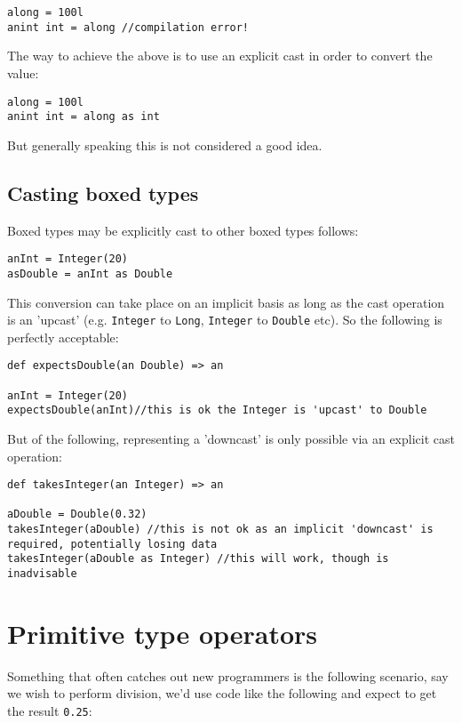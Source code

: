 \documentclass[conc-doc]{subfiles}
\begin{document}
\begin{lstlisting}
along = 100l
anint int = along //compilation error!
\end{lstlisting}

The way to achieve the above is to use an explicit cast in order to convert the value:

\begin{lstlisting}
along = 100l
anint int = along as int
\end{lstlisting}

But generally speaking this is not considered a good idea.

\subsection{Casting boxed types}
Boxed types may be explicitly cast to other boxed types follows:
\begin{lstlisting}
anInt = Integer(20)
asDouble = anInt as Double
\end{lstlisting}

This conversion can take place on an implicit basis as long as the cast operation is an 'upcast' (e.g. \lstinline{Integer} to \lstinline{Long}, \lstinline{Integer} to \lstinline{Double} etc). So the following is perfectly acceptable:
\begin{lstlisting}
def expectsDouble(an Double) => an

anInt = Integer(20)
expectsDouble(anInt)//this is ok the Integer is 'upcast' to Double
\end{lstlisting}

But of the following, representing a 'downcast' is only possible via an explicit cast operation:

\begin{lstlisting}
def takesInteger(an Integer) => an

aDouble = Double(0.32)
takesInteger(aDouble) //this is not ok as an implicit 'downcast' is required, potentially losing data
takesInteger(aDouble as Integer) //this will work, though is inadvisable
\end{lstlisting}

\section{Primitive type operators}
Something that often catches out new programmers is the following scenario, say we wish to perform division, we'd use code like the following and expect to get the result \lstinline{0.25}:
\end{document}
